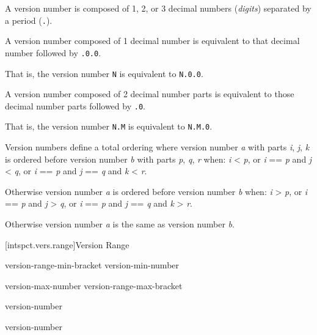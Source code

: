 \pnum
A version number is composed of 1, 2, or 3 decimal numbers (\emph{digits})
separated by a period (\verb|.|).

\pnum
A version number composed of 1 decimal number is equivalent to that decimal
number followed by \verb|.0.0|.

\begin{note}
That is, the version number \verb|N| is equivalent to \verb|N.0.0|.
\end{note}

\pnum
A version number composed of 2 decimal number parts is equivalent to those
decimal number parts followed by \verb|.0|.

\begin{note}
That is, the version number \verb|N.M| is equivalent to \verb|N.M.0|.
\end{note}

\pnum
Version numbers define a total ordering where version number \emph{a} with parts
\emph{i}, \emph{j}, \emph{k} is ordered before version number \emph{b} with
parts \emph{p}, \emph{q}, \emph{r} when: \emph{i} < \emph{p}, or \emph{i} ==
\emph{p} and \emph{j} < \emph{q}, or \emph{i} == \emph{p} and \emph{j} ==
\emph{q} and \emph{k} < \emph{r}.

\pnum
Otherwise version number \emph{a} is ordered before version number \emph{b}
when: \emph{i} > \emph{p}, or \emph{i} == \emph{p} and \emph{j} > \emph{q}, or
\emph{i} == \emph{p} and \emph{j} == \emph{q} and \emph{k} > \emph{r}.

\pnum
Otherwise version number \emph{a} is the same as version number \emph{b}.

[intspct.vers.range]{Version Range}

\pnum
\begin{bnf}

\br
	version-range-min-bracket version-min-number 

\br
	\terminal{,} version-max-number version-range-max-bracket

\br
	version-number

\br
	version-number

\br
	\br
	\terminal{[ (}

\br
	\br
	\terminal{) ]}

\end{bnf}

